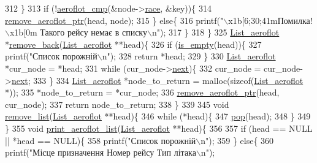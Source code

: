 \begin{DoxyCodeInclude}
{312     \}
313     \textcolor{keywordflow}{if} (!\hyperlink{main_8c_a268a550e94036d245188ea5dc9f89155}{aeroflot\_cmp}(&node->\hyperlink{structsingle__linked__list__aeroflot__struct_af1c1f161b03433dfe3a7f4028dd58b71}{race}, &key))\{
314         \hyperlink{main_8c_a81b22e06ebb21b94865712c93f535f12}{remove\_aeroflot\_ptr}(head, node);
315     \} \textcolor{keywordflow}{else}\{
316         printf(\textcolor{stringliteral}{"\(\backslash\)x1b[6;30;41mПомилка!\(\backslash\)x1b[0m  Такого рейсу немає в списку\(\backslash\)n"});
317     \}
318 \}
325 \hyperlink{structsingle__linked__list__aeroflot__struct}{List\_aeroflot} *\hyperlink{main_8c_a85d439fd81dd1e929276ba46d86eb80d}{remove\_back}(\hyperlink{structsingle__linked__list__aeroflot__struct}{List\_aeroflot} **head)\{
326     \textcolor{keywordflow}{if} (\hyperlink{main_8c_a4d48471ab7b12b187d04943f4d808488}{is\_empty}(head))\{
327         printf(\textcolor{stringliteral}{"Список порожній\(\backslash\)n"});
328         \textcolor{keywordflow}{return} *head;
329     \}
330     \hyperlink{structsingle__linked__list__aeroflot__struct}{List\_aeroflot} *cur\_node = *head;
331     \textcolor{keywordflow}{while} (cur\_node->\hyperlink{structsingle__linked__list__aeroflot__struct_a8aed81380fcda3f4230250e126b28d5e}{next})\{
332         cur\_node = cur\_node->\hyperlink{structsingle__linked__list__aeroflot__struct_a8aed81380fcda3f4230250e126b28d5e}{next};
333     \}
334     \hyperlink{structsingle__linked__list__aeroflot__struct}{List\_aeroflot} *node\_to\_return = malloc(\textcolor{keyword}{sizeof}(\hyperlink{structsingle__linked__list__aeroflot__struct}{List\_aeroflot} *));
335     *node\_to\_return = *cur\_node;
336     \hyperlink{main_8c_a81b22e06ebb21b94865712c93f535f12}{remove\_aeroflot\_ptr}(head, cur\_node);
337     \textcolor{keywordflow}{return} node\_to\_return;
338 \}
339 
345 \textcolor{keywordtype}{void} \hyperlink{main_8c_a46177683269c93d16370b166da7b9b17}{remove\_list}(\hyperlink{structsingle__linked__list__aeroflot__struct}{List\_aeroflot} **head)\{
346     \textcolor{keywordflow}{while} (*head)\{
347         \hyperlink{main_8c_a7e397112c557e808e91ddfdb85d3323c}{pop}(head);
348     \}
349 \}
355 \textcolor{keywordtype}{void} \hyperlink{main_8c_a5f6128fb431c14b0ec5e1b28f7d86f55}{print\_aeroflot\_list}(\hyperlink{structsingle__linked__list__aeroflot__struct}{List\_aeroflot} **head)\{
356 
357     \textcolor{keywordflow}{if} (head == NULL || *head == NULL)\{
358         printf(\textcolor{stringliteral}{"Список порожній\(\backslash\)n"});
359     \} \textcolor{keywordflow}{else}\{
360         printf(\textcolor{stringliteral}{"Місце призначення        Номер рейсу      Тип літака\(\backslash\)n"});
}
\end{DoxyCodeInclude}
